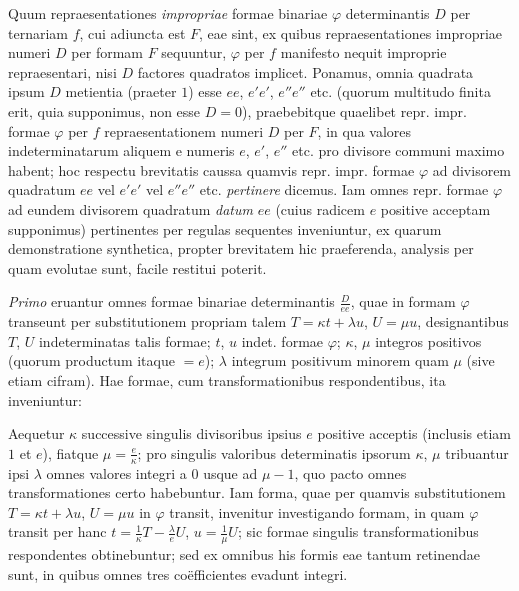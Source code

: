 Quum repraesentationes \textit{impropriae} formae binariae $\varphi$ determinantis $D$ per ternariam $f$, cui adiuncta est $F$, eae sint, ex quibus repraesentationes
impropriae numeri $D$ per formam $F$ sequuntur, $\varphi$ per $f$ manifesto nequit improprie repraesentari, nisi $D$ factores quadratos implicet. Ponamus, omnia quadrata ipsum $D$ metientia (praeter $1$) esse $ee$, $e'e'$, $e''e''$ etc. (quorum multitudo finita erit, quia supponimus, non esse $D=0$), praebebitque quaelibet repr. impr. formae $\varphi$ per $f$ repraesentationem numeri $D$ per $F$, in qua valores indeterminatarum aliquem e numeris $e$, $e'$, $e''$ etc. pro divisore communi maximo habent; hoc respectu brevitatis caussa quamvis repr. impr. formae $\varphi$ ad divisorem quadratum $ee$ vel $e'e'$ vel $e''e''$ etc. \textit{pertinere} dicemus. Iam omnes repr. formae $\varphi$ ad eundem divisorem quadratum \textit{datum} $ee$ (cuius radicem $e$ positive acceptam supponimus) pertinentes per regulas sequentes inveniuntur, ex quarum demonstratione synthetica, propter brevitatem hic praeferenda, analysis per quam evolutae sunt, facile restitui poterit.

\textit{Primo} eruantur omnes formae binariae determinantis $\frac{D}{ee}$, quae in formam $\varphi$ transeunt per substitutionem propriam talem $T=\kappa t+\lambda u$, $U=\mu u$, designantibus $T$, $U$ indeterminatas talis formae; $t$, $u$ indet. formae $\varphi$; $\kappa$, $\mu$ integros positivos (quorum productum itaque $=e$); $\lambda$ integrum positivum minorem quam $\mu$ (sive etiam cifram). Hae formae, cum transformationibus respondentibus, ita inveniuntur:

Aequetur $\kappa$ successive singulis divisoribus ipsius $e$ positive acceptis (inclusis etiam $1$ et $e$), fiatque $\mu=\frac{e}{\kappa}$; pro singulis valoribus determinatis ipsorum $\kappa$, $\mu$ tribuantur ipsi $\lambda$ omnes valores integri a $0$ usque ad $\mu-1$, quo pacto omnes transformationes certo habebuntur. Iam forma, quae per quamvis substitutionem $T=\kappa t+\lambda u$, $U=\mu u$ in $\varphi$ transit, invenitur investigando formam, in quam $\varphi$ transit per hanc $t=\frac{1}{\kappa}T-\frac{\lambda}{e}U$, $u=\frac{1}{\mu}U$; sic formae singulis transformationibus respondentes obtinebuntur; sed ex omnibus his formis eae tantum retinendae sunt, in quibus omnes tres coëfficientes evadunt integri.

